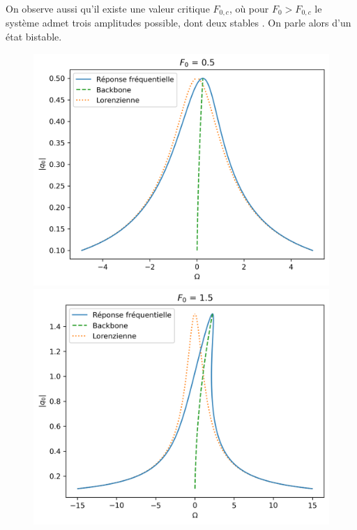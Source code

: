 On observe aussi qu'il existe une valeur critique $F_{0,c}$, où pour $F_0 > F_{0,c}$ le système admet trois amplitudes possible, dont deux stables \cite{landau_mechanics_1976}. On parle alors d'un état bistable.
%
\begin{figure}
    
    \begin{subcaptionblock}{.31\linewidth}
      \includegraphics[width=\linewidth]{images/duffing/F0=0.5.png}%
    \end{subcaptionblock}
    \begin{subcaptionblock}{.31\linewidth}
      \includegraphics[width=\linewidth]{images/duffing/F0=1.5.png}%

\end{subcaptionblock}
\end{figure}
